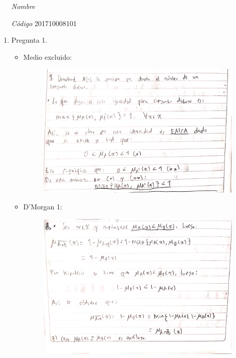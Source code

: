 \documentclass[fleqn]{article}
\begin{document}
 \vspace{0.3cm}
   \begin{itemize}[leftmargin=6.25cm, labelsep=0.5cm]

     \item[\textit{Nombre}]  %
     \item[\textit{Código}] 201710008101 %

   \end{itemize}

   \begin{enumerate}
     \item Pregunta 1.
       \begin{itemize}
         \item Medio excluido:
           \begin{figure}[H]
             \centering
             \includegraphics[scale=.5]{figs/1a}
           \end{figure}
        \pagebreak
         \item D'Morgan 1:
           \begin{figure}[h]
             \centering
             \includegraphics[scale=.5]{figs/1b1}

\end{figure}
\end{itemize}
\end{enumerate}
\end{document}
